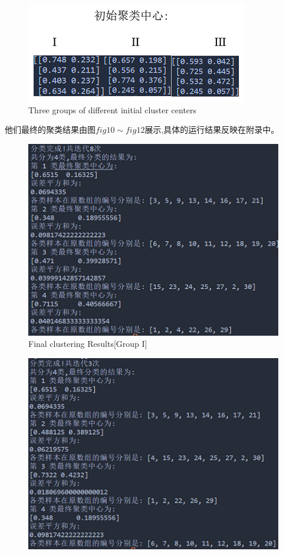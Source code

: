 \documentclass[homework]{IEEEtran}
\begin{document}
\begin{CJK}{UTF8}{gkai}
\begin{figure}[htb]
    \centerline{\includegraphics{Images/fig9.png}}
    \caption{Three groups of different initial cluster centers}
    \label{fig9}
    \end{figure} \par

\vspace{15mm}
他们最终的聚类结果由图$fig10 \sim fig12$展示,具体的运行结果反映在附录中。 \par
\begin{figure}[htb]
    \centerline{\includegraphics{Images/fig10.png}}
    \caption{Final clustering Results[Group I]}
    \label{fig10}
    \end{figure} \par
\begin{figure}[htb]
    \centerline{\includegraphics{Images/fig11.png}}

\end{figure}
\end{CJK}
\end{document}
